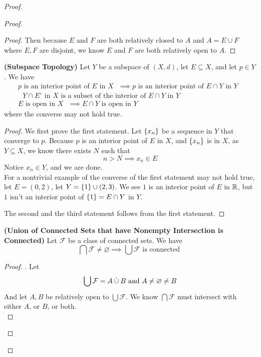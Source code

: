 \documentclass{report}
\begin{document}
\begin{proof}
\begin{proof}
\begin{proof}
Then because $E$ and  $F$ are both relatively closed to  $A$ and  $A=E\cup F$ where $E,F$ are disjoint, we know  $E$ and  $F$ are both relatively open to  $A$.
\end{proof}
\begin{theorem}
\label{6.3.2}
\textbf{(Subspace Topology)} Let $Y$ be a subspace of $(X,d)$, let $E\subseteq X$, and let $p\in  Y$. We have
\begin{gather}
p\text{ is an interior point of $E$ in $X$ }\implies p\text{ is an interior point of $E\cap Y$ in $Y$ } \\
\text{ $Y\cap E^\circ $ in $X$ is a subset of the interior of $E\cap Y$ in $Y$ }\\
E\text{ is open in $X$ }\implies E\cap Y\text{ is open in $Y$ }
\end{gather}
where the converse may not hold true.
\end{theorem}
\begin{proof}
We first prove the first statement. Let $\{ x_n \}$ be a sequence in $Y$ that converge to $p$. Because  $p$ is an interior point of  $E$ in  $X$, and  $\{ x_n \}$ is in $X$, as  $Y\subseteq X$, we know there exists $N$ such that 
 \begin{equation}
n>N\implies x_n\in E
\end{equation}
Notice $x_n\in Y$, and we are done.\\

For a nontrivial example of the converse of the first statement may not hold true, let $E=(0,2)$, let $Y=\{ 1 \}\cup (2,3)$. We see $1$ is an interior point of  $E$ in  $\mathbb{R}$, but  $1$ isn't an interior point of  $\{ 1 \}=E\cap Y$ in $Y$.

The second and the third statement follows from the first statement. 
\end{proof}
\begin{theorem}
\label{6.3.3}
\textbf{(Union of Connected Sets that have Nonempty Intersection is Connected)} Let $\mathcal{F}$ be a class of connected sets. We have 
\begin{equation}
\bigcap \mathcal{F}\neq \varnothing \implies \bigcup \mathcal{F}\text{ is connected }
\end{equation}
\end{theorem}
\begin{proof}
. Let 
\begin{equation}
\bigcup  \mathcal{F}= A \mathbin{\dot{\cup}} B\text{ and }A\neq \varnothing\neq B
\end{equation}
And let $A,B$ be relatively open to  $\bigcup \mathcal{F}$. We know $\bigcap \mathcal{F}$ must intersect with either $A$, or  $B$, or both.\\


\end{proof}
\end{proof}
\end{proof}
\end{document}

